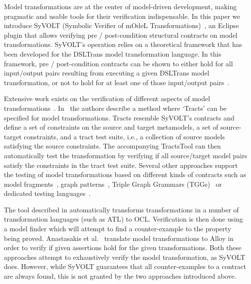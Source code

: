 Model transformations are at the center of model-driven development, making
pragmatic and usable tools for their verification indispensable. In this paper
we introduce SyVOLT (Symbolic Verifier of mOdeL Transformations)~\cite{syvolt},
an Eclipse plugin that allows verifying pre / post-condition structural
contracts on model transformations. SyVOLT's operation relies on a theoretical framework
that has been developed for the DSLTrans model transformation language. In this
framework, pre / post-condition contracts can be shown to either hold for all
input/output pairs resulting from executing a given DSLTrans model
transformation, or not to hold for at least one of those input/output
pairs~\cite{Lucio2014}.


Extensive work exists on the verification of different aspects of model
transformations~\cite{AmraniLSCDVTC12}. In~\cite{Vallecillo2012} the
authors describe a method where `Tracts' can be specified for model
transformations. Tracts resemble SyVOLT's contracts and define a set
of constraints on the source and target metamodels, a set of source-target constraints, and a tract test suite, i.e., a collection of source models
satisfying the source constraints. The accompanying TractsTool can then
automatically test the transformation by verifying if all source/target model
pairs satisfy the constraints in the tract test suite.
Several other approaches support the testing of model transformations based
on different kinds of contracts such as model fragments~\cite{Mottu2008}, graph
patterns~\cite{Guerra12,BaloghBCGHMPPRVa10}, Triple Graph Grammars (TGGs)~\cite{WieberAS14} or dedicated testing
languages~\cite{Garcia-Dominguez11}. 

The tool described in \cite{Buettner2013} automatically transforms
transformations in a number of transformation languages (such as ATL) to OCL. Verification is then
done using a model finder which will attempt to find a counter-example to the
property being proved. Anastasakis et al.~\cite{Anastasakis07}
translate model transformations to Alloy in order to verify if given
assertions hold for the given transformations. Both these
approaches attempt to exhaustively verify the model transformation, as SyVOLT
does. However, while SyVOLT guarantees that all counter-examples to a contract
are always found, this is not granted by the two approaches introduced above.

